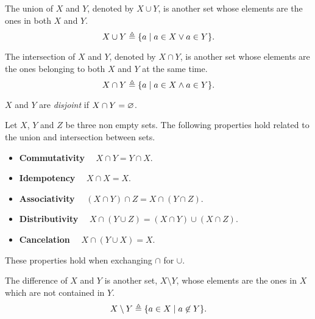 \begin{defn}[Union]
    The union of $X$ and $Y$, denoted by $X\cup Y$, is another set whose elements are the ones 
    in both $X$ and $Y$.
    \begin{equation}
        X\cup Y\triangleq\{ a\; | \; a\in X\vee a\in Y \}.
    \end{equation}
\end{defn}

\begin{defn}[Intersection]
    The intersection of $X$ and $Y$, denoted by $X\cap Y$, is another set whose elements are 
    the ones belonging to both $X$ and $Y$ at the same time.
    \begin{equation}
        X\cap Y\triangleq\{ a\; | \; a\in X\wedge a\in Y \}.
    \end{equation}
\end{defn}

\begin{defn}
    $X$ and $Y$ are \textit{disjoint} if $X\cap Y = \O$.
\end{defn}

\begin{prop}
    Let $X$, $Y$ and $Z$ be three non empty sets. The following properties hold related to the union and intersection 
    between sets.
    \begin{itemize}[itemsep = -2pt]
        \item \textbf{Commutativity} $\quad X\cap Y = Y\cap X$.
        \item \textbf{Idempotency} $\quad X\cap X = X$.
        \item \textbf{Associativity} $\quad\left(X\cap Y\right)\cap Z = X\cap\left(Y\cap Z\right)$.
        \item \textbf{Distributivity} $\quad X\cap\left(Y\cup Z\right) = \left(X\cap Y\right)\cup\left(X\cap Z\right)$.
        \item \textbf{Cancelation} $\quad X\cap\left(Y\cup X\right) = X$.
    \end{itemize}
\end{prop}

\begin{remark}
    These properties hold when exchanging $\cap$ for $\cup$.
\end{remark}

\begin{defn}[Difference]
The difference of $X$ and $Y$ is another set, $X\setminus Y$, whose elements are the ones in $X$ which are not contained in
$Y$.
\begin{equation}
    X\setminus Y\triangleq\{ a\in X\; | \; a\not\in Y \}.
\end{equation}
\end{defn}

